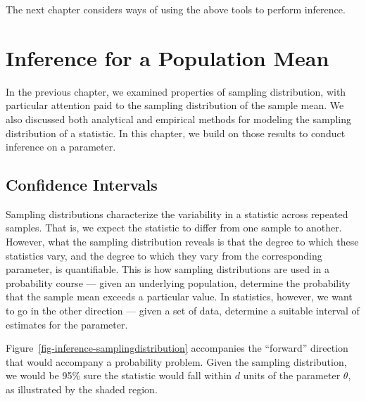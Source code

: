 \documentclass[
  letterpaper,
  DIV=11,
  numbers=noendperiod]{scrreprt}
\theoremstyle{definition}
\theoremstyle{plain}
\theoremstyle{definition}
\theoremstyle{remark}
\begin{document}
The next chapter considers ways of using the above tools to perform
inference.


\chapter{Inference for a Population Mean}\label{sec-inference}

\providecommand{\norm}[1]{\left\lVert#1\right\rVert}
\providecommand{\abs}[1]{\left\lvert#1\right\rvert}
\providecommand{\dist}[1]{\stackrel{\text{#1}}{\sim}}
\providecommand{\ind}[1]{\mathbb{I}\left(#1\right)}
\providecommand{\bm}[1]{\mathbf{#1}}
\providecommand{\bs}[1]{\boldsymbol{#1}}
\providecommand{\Ell}{\mathcal{L}}
\providecommand{\indep}{\perp\negthickspace\negmedspace\perp}

In the previous chapter, we examined properties of sampling
distribution, with particular attention paid to the sampling
distribution of the sample mean. We also discussed both analytical and
empirical methods for modeling the sampling distribution of a statistic.
In this chapter, we build on those results to conduct inference on a
parameter.

\section{Confidence Intervals}\label{confidence-intervals}

Sampling distributions characterize the variability in a statistic
across repeated samples. That is, we expect the statistic to differ from
one sample to another. However, what the sampling distribution reveals
is that the degree to which these statistics vary, and the degree to
which they vary from the corresponding parameter, is quantifiable. This
is how sampling distributions are used in a probability course --- given
an underlying population, determine the probability that the sample mean
exceeds a particular value. In statistics, however, we want to go in the
other direction --- given a set of data, determine a suitable interval
of estimates for the parameter.

Figure~\ref{fig-inference-samplingdistribution} accompanies the
``forward'' direction that would accompany a probability problem. Given
the sampling distribution, we would be 95\% sure the statistic would
fall within \(d\) units of the parameter \(\theta\), as illustrated by
the shaded region.
\end{document}
